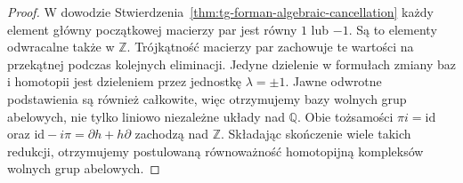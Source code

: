 \begin{proof}
W dowodzie Stwierdzenia~\ref{thm:tg-forman-algebraic-cancellation}
każdy element główny początkowej macierzy par jest równy $1$ lub $-1$.
Są to elementy odwracalne także w $\mathbb Z$.
Trójkątność macierzy par zachowuje te wartości na
przekątnej podczas kolejnych eliminacji. Jedyne
dzielenie w formułach zmiany baz i homotopii jest
dzieleniem przez jednostkę $\lambda=\pm1$.
Jawne odwrotne podstawienia są również całkowite,
więc otrzymujemy bazy wolnych grup abelowych,
nie tylko liniowo niezależne układy nad $\mathbb Q$.
Obie tożsamości $\pi i=\mathrm{id}$ oraz
$\mathrm{id}-i\pi=\partial h+h\partial$ zachodzą
nad $\mathbb Z$. Składając skończenie wiele takich
redukcji, otrzymujemy postulowaną równoważność
homotopijną kompleksów wolnych grup abelowych.
\end{proof}

